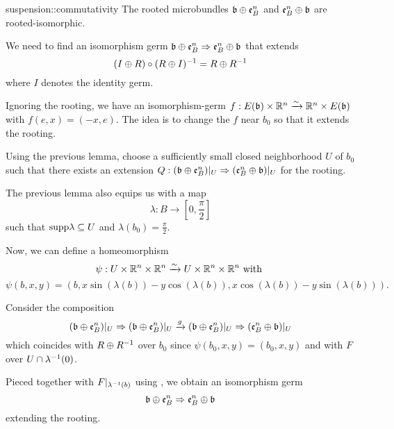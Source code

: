 \begin{mylemma}{suspension::commutativity}
    The rooted microbundles $\mathfrak{b} \oplus{} \mathfrak{e}^{n}_{B}$ and $\mathfrak{e}^{n}_{B} \oplus{} \mathfrak{b}$ are rooted-isomorphic. 
\end{mylemma}

\begin{myproof}
    We need to find an isomorphism germ
    $\mathfrak{b} \oplus{} \mathfrak{e}^{n}_{B} \Rightarrow{} \mathfrak{e}^{n}_{B} \oplus{} \mathfrak{b}$ that extends
    \[ (I \oplus{} R) \circ (R \oplus{} I)^{-1} = R \oplus{} R^{-1} \]
    where $I$ denotes the identity germ.

    Ignoring the rooting, we have an
    isomorphism-germ $f: E(\mathfrak{b}) \times \mathbb{R}^n \xrightarrow{\sim} \mathbb{R}^n \times E(\mathfrak{b})$ with $f(e, x) = (-x, e)$.
    The idea is to change the $f$ near $b_0$ so that it extends the rooting.

    Using the previous lemma, choose a sufficiently small closed neighborhood $U$ of $b_0$
    such that there exists an extension
    $Q: (\mathfrak{b} \oplus{} \mathfrak{e}^{n}_{B})\vert_{U} \Rightarrow{} (\mathfrak{e}^{n}_{B} \oplus{} \mathfrak{b})\vert_{U}$ for the rooting.

    The previous lemma also equips us with a map
    \[ \lambda: B \to [0, \frac{\pi}{2}] \]
    such that $\text{supp} \lambda \subseteq{} U$ and $\lambda(b_0) = \frac{\pi}{2}$.
    
    Now, we can define a homeomorphism
    \[ \psi: U \times \mathbb{R}^n \times \mathbb{R}^n \xrightarrow{\sim} U \times \mathbb{R}^n \times \mathbb{R}^n \text{ with } \]
    \[ \psi(b, x, y) = (b, x \sin(\lambda(b)) - y \cos(\lambda(b)), x \cos(\lambda(b)) - y \sin(\lambda(b))). \]

    Consider the composition
    \[ (\mathfrak{b} \oplus{} \mathfrak{e}^{n}_{B})\vert_{U} \Rightarrow{} (\mathfrak{b} \oplus{} \mathfrak{e}^{n}_{B})\vert_{U} \xrightarrow{g} (\mathfrak{b} \oplus{} \mathfrak{e}^{n}_{B})\vert_{U} \Rightarrow{} (\mathfrak{e}^{n}_{B} \oplus{} \mathfrak{b})\vert_{U} \]
    which coincides with $R \oplus{} R^{-1}$ over $b_0$
    since $\psi(b_0, x, y) = (b_0, x, y)$ and with $F$ over $U \cap \lambda^{-1}(0)$.
    
    Pieced together with $F\vert_{\lambda^{-1}(b)}$ using ,
    we obtain an isomorphism germ 
    \[ \mathfrak{b} \oplus{} \mathfrak{e}^{n}_{B} \Rightarrow{} \mathfrak{e}^{n}_{B} \oplus{} \mathfrak{b} \]
    extending the rooting.
\end{myproof}